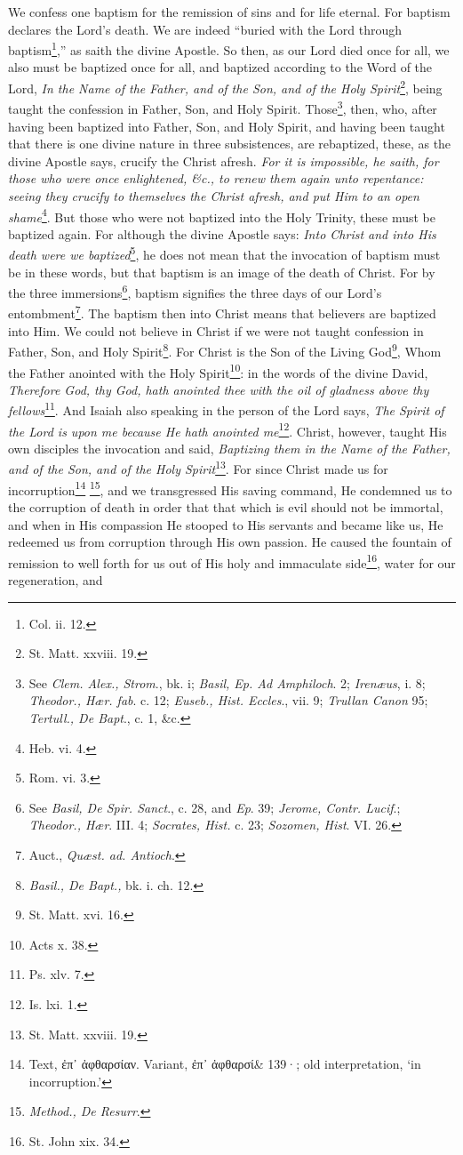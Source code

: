 We confess one baptism for the remission of sins and for life eternal. For baptism declares the Lord’s death. We are indeed “buried with the Lord through baptism\footnote{Col. ii. 12.},” as saith the divine Apostle. So then, as our Lord died once for all, we also must be baptized once for all, and baptized according to the Word of the Lord, \emph{In the Name of the Father, and of the Son, and of the Holy Spirit}\footnote{St. Matt. xxviii. 19.}, being taught the confession in Father, Son, and Holy Spirit. Those\footnote{See \emph{Clem. Alex., Strom}., bk. i; \emph{Basil, Ep. Ad Amphiloch}. 2; \emph{Irenæus}, i. 8; \emph{Theodor., Hær. fab}. c. 12; \emph{Euseb., Hist. Eccles}., vii. 9; \emph{Trullan Canon }95; \emph{Tertull., De Bapt}., c. 1, \&c.}, then, who, after having been baptized into Father, Son, and Holy Spirit, and having been taught that there is one divine nature in three subsistences, are rebaptized, these, as the divine Apostle says, crucify the Christ afresh. \emph{For it is impossible, he saith, for those who were once enlightened, \&c., to renew them again unto repentance: seeing they crucify to themselves the Christ afresh, and put Him to an open shame}\footnote{Heb. vi. 4.}. But those who were not baptized into the Holy Trinity, these must be baptized again. For although the divine Apostle says: \emph{Into Christ and into His death were we baptized}\footnote{Rom. vi. 3.}, he does not mean that the invocation of baptism must be in these words, but that baptism is an image of the death of Christ. For by the three immersions\footnote{See \emph{Basil, De Spir. Sanct}., c. 28, and \emph{Ep}. 39; \emph{Jerome, Contr. Lucif}.; \emph{Theodor., Hær}. III. 4; \emph{Socrates, Hist. }c. 23; \emph{Sozomen, Hist}. VI. 26.}, baptism signifies the three days of our Lord’s entombment\footnote{Auct., \emph{Quæst. ad. Antioch}.}. The baptism then into Christ means that believers are baptized into Him. We could not believe in Christ if we were not taught confession in Father, Son, and Holy Spirit\footnote{\emph{Basil., De Bapt., }bk. i. ch. 12.}. For Christ is the Son of the Living God\footnote{St. Matt. xvi. 16.}, Whom the Father anointed with the Holy Spirit\footnote{Acts x. 38.}: in the words of the divine David, \emph{Therefore God, thy God, hath anointed thee with the oil of gladness above thy fellows}\footnote{Ps. xlv. 7.}. And Isaiah also speaking in the person of the Lord says, \emph{The Spirit of the Lord is upon me because He hath anointed me}\footnote{Is. lxi. 1.}. Christ, however, taught His own disciples the invocation and said, \emph{Baptizing them in the Name of the Father, and of the Son, and of the Holy Spirit}\footnote{St. Matt. xxviii. 19.}. For since Christ made us for incorruption\footnote{Text, \textgreek{ἐπ᾽ ἀφθαρσίαν}. Variant, \textgreek{ἐπ᾽ ἀφθαρσί\& 139·}; old interpretation, ‘in incorruption.’} \footnote{\emph{Method., De Resurr}.}, and we transgressed His saving command, He condemned us to the corruption of death in order that that which is evil should not be immortal, and when in His compassion He stooped to His servants and became like us, He redeemed us from corruption through His own passion. He caused the fountain of remission to well forth for us out of His holy and immaculate side\footnote{St. John xix. 34.}, water for our regeneration, and 